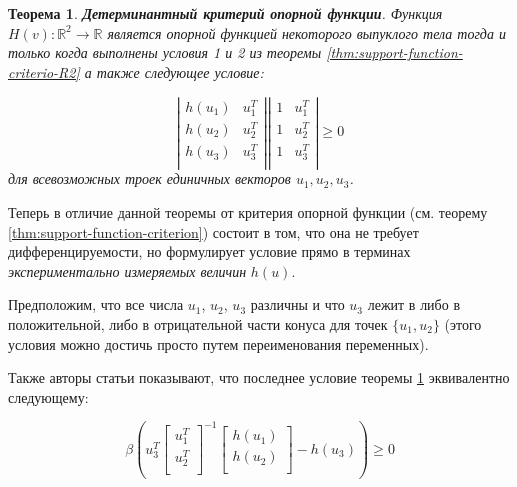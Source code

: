 \documentclass[a4paper, 12pt, titlepage]{article}
\theoremstyle{definition}
\theoremstyle{plain}
\newtheorem{SmartTheorem}{Теорема}
\theoremstyle{plain}
\begin{document}
\begin{SmartTheorem}
 \label{thm:support-function-criterio-R2-det}
 \textbf{Детерминантный критерий опорной функции}.
 Функция $H(v): \mathbb{R}^{2} \to \mathbb{R}$ является опорной функцией
 некоторого выпуклого тела тогда и только когда выполнены условия 1 и 2 из
 теоремы \ref{thm:support-function-criterio-R2} а также следующее условие:

\begin{equation}
 \left|\begin{array}{cc}
  h(u_{1}) & u_{1}^{T} \\
  h(u_{2}) & u_{2}^{T} \\
  h(u_{3}) & u_{3}^{T} \\
 \end{array}\right|
  \left|\begin{array}{cc}
  1 & u_{1}^{T} \\
  1 & u_{2}^{T} \\
  1 & u_{3}^{T} \\
 \end{array}\right|
 \geq 0
\end{equation}
для всевозможных троек единичных векторов $u_{1}, u_{2}, u_{3}$.
\end{SmartTheorem}

Теперь в отличие данной теоремы от критерия опорной функции (см. теорему
\ref{thm:support-function-criterion}) состоит в том, что она не требует
дифференцируемости, но формулирует условие прямо в терминах
\textit{экспериментально измеряемых величин} $h(u)$.

Предположим, что все числа $u_{1}$, $u_{2}$, $u_{3}$ различны и что $u_{3}$
лежит в либо в положительной, либо в отрицательной части конуса для точек
$\{u_{1}, u_{2}\}$ (этого условия можно достичь просто путем переименования
переменных).

Также авторы статьи показывают, что последнее условие теоремы
\ref{thm:support-function-criterio-R2-det} эквивалентно следующему:

\begin{equation}
 \beta \left( u_{3}^{T}
 \left[
 \begin{array}{c}
 u_{1}^{T} \\
 u_{2}^{T} \\
 \end{array}
 \right]^{-1}
 \left[
 \begin{array}{c}
 h(u_{1}) \\
 h(u_{2}) \\
 \end{array}
 \right] - h(u_{3}) \right) \geq 0
\end{equation}
\end{document}
